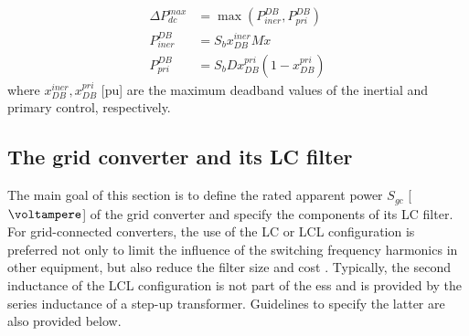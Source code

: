 \documentclass[utf8]{frontiersSCNS} %
\begin{document}
\begin{align}
    \Delta P_{dc}^{max} &= \max(P_{iner}^{DB},P_{pri}^{DB}) \label{eq:power-delta-dc} \\
    P_{iner}^{DB} &= S_b x_{DB}^{iner} M \dot{x} \label{eq:power-delta-dc-iner} \\
    P_{pri}^{DB} &= S_b D x_{DB}^{pri} (1 - x_{DB}^{pri}) \label{eq:power-delta-dc-pri}
\end{align}
where $x_{DB}^{iner}, x_{DB}^{pri}$ [pu] are the maximum deadband values of the inertial and primary control, respectively.


\subsection{The grid converter and its LC filter}\label{sec:grid-converter}

The main goal of this section is to define the rated apparent power $S_{gc}$ [$\si{\voltampere}$] of the grid converter and specify the components of its LC filter. For grid-connected converters, the use of the LC or LCL configuration is preferred not only to limit the influence of the switching frequency harmonics in other equipment, but also reduce the filter size and cost \citep{beresReviewPassivePower2016}. Typically, the second inductance of the LCL configuration is not part of the \gls{ess} and is provided by the series inductance of a step-up transformer. Guidelines to specify the latter are also provided below.
\end{document}
